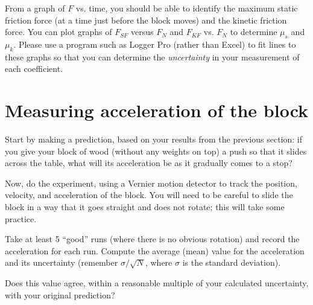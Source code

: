 \documentclass[11pt]{article}
\begin{document}
From a graph of $F$ vs. time, you should be able to identify the 
maximum static friction force (at a time just before the block moves) and the 
kinetic friction force.  You can plot graphs of $F_{SF}$ versus $F_N$ and
$F_{KF}$ vs. $F_N$ to determine $\mu_s$ and $\mu_k$.  Please use a program
such as Logger Pro (rather than Excel) to fit lines to these graphs so that 
you can determine the {\em uncertainty} in your measurement of each coefficient.


\section{Measuring acceleration of the block}

Start by making a prediction, based on your results from the previous section:
if you give your block of wood (without any weights on 
  top) a push so that it slides across the table, what will its acceleration be as it gradually comes to a stop?  

Now, do the experiment, using a Vernier motion detector to track the 
position, velocity, and acceleration of the block.  You will need to be 
careful to slide the block in a way that it goes straight and does not
rotate; this will take some practice.

Take at least 5 ``good'' runs (where there is no obvious rotation) 
and record the acceleration for each run.  Compute the average (mean) value
for the acceleration and its uncertainty (remember $\sigma / \sqrt{N}$,
where $\sigma$ is the standard deviation).  

Does this value agree, within a reasonable multiple of your calculated 
uncertainty, with your original prediction?
\end{document}
